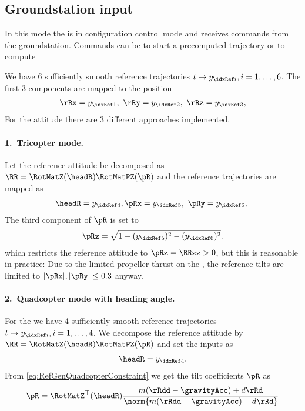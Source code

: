 \subsection{Groundstation input}
In this mode the \Multicopter is in configuration control mode and receives commands from the groundstation.
Commands can be to start a precomputed trajectory or to compute 

We have 6 sufficiently smooth reference trajectories $t \mapsto y_{\idxRef i}, i=1,\ldots,6$.
The first 3 components are mapped to the position
\begin{align}
 \rRx = y_{\idxRef1}, \
 \rRy = y_{\idxRef2}, \
 \rRz = y_{\idxRef3}, 
\end{align}
For the attitude there are 3 different approaches implemented.

\paragraph{1.\ Tricopter mode.}
Let the reference attitude be decomposed as $\RR = \RotMatZ(\headR) \RotMatPZ(\pR)$ and the reference trajectories are mapped as
\begin{align}
 \headR = y_{\idxRef4},
 \pRx = y_{\idxRef5}, \
 \pRy = y_{\idxRef6}, \
\end{align}
The third component of $\pR$ is set to
\begin{align}
 \pRz = \sqrt{1 - (y_{\idxRef5})^2 - (y_{\idxRef6})^2}.
\end{align}
which restricts the reference attitude to $\pRz = \RRzz > 0$, but this is reasonable in practice:
Due to the limited propeller thrust on the \Tricopter, the reference tilts are limited to $|\pRx|, |\pRy| \leq 0.3$ anyway.

\paragraph{2.\ Quadcopter mode with heading angle.}
For the \Quadcopter we have 4 sufficiently smooth reference trajectories $t \mapsto y_{\idxRef i}, i=1,\ldots,4$.
We decompose the reference attitude by $\RR = \RotMatZ(\headR) \RotMatPZ(\pR)$ and set the inputs as
\begin{align}
 \headR = y_{\idxRef4}.
\end{align}
From \eqref{eq:RefGenQuadcopterConstraint} we get the tilt coefficients $\pR$ as
\begin{align}
 \pR = \RotMatZ^\top(\headR) \frac{m(\rRdd-\gravityAcc) + d\rRd}{\norm{m(\rRdd-\gravityAcc) + d\rRd}}
\end{align}


